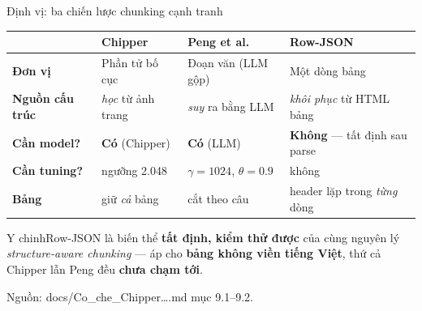 \documentclass[aspectratio=169,11pt]{beamer}
\newcommand{\src}[1]{{\footnotesize\ttfamily #1}}
\newcommand{\keyidea}[1]{%
  \begin{center}\begin{block}{\small Y chinh}\centering #1\end{block}\end{center}}
\begin{document}
\begin{frame}{Định vị: ba chiến lược chunking cạnh tranh}
  \centering\footnotesize
  \begin{tabular}{@{}l p{} p{} p{}@{}}
    & \textbf{Chipper} & \textbf{Peng et al.} & \textbf{Row-JSON} \\
    \midrule
    \textbf{Đơn vị} & Phần tử bố cục & Đoạn văn (LLM gộp) & Một dòng bảng \\
    \textbf{Nguồn cấu trúc} & \emph{học} từ ảnh trang & \emph{suy} ra bằng LLM & \emph{khôi phục} từ HTML bảng \\
    \textbf{Cần model?} & \textbf{Có} (Chipper) & \textbf{Có} (LLM) & \textbf{Không} — tất định sau parse \\
    \textbf{Cần tuning?} & ngưỡng 2.048 & $\gamma{=}1024$, $\theta{=}0.9$ & không \\
    \textbf{Bảng} & giữ \emph{cả} bảng & cắt theo câu & header lặp trong \emph{từng} dòng \\
    \bottomrule
  \end{tabular}
  \vspace{0.4em}
  \keyidea{Row-JSON là biến thể \textbf{tất định, kiểm thử được} của cùng
  nguyên lý \emph{structure-aware chunking} — áp cho \textbf{bảng không viền tiếng
  Việt}, thứ cả Chipper lẫn Peng đều \textbf{chưa chạm tới}.}
  \vspace{0.2em}
  {\footnotesize Nguồn: \src{docs/Co\_che\_Chipper\ldots.md} mục 9.1--9.2.}
\end{frame}
\end{document}
